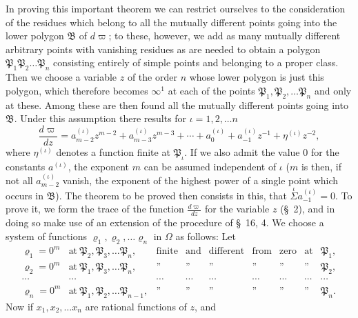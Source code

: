 \documentclass{article}
\begin{document}
In proving this important theorem we can restrict ourselves to the consideration of the residues which belong to all the mutually different points going into the lower polygon $\mathfrak{B}$ of $d\varpi$; to these, however, we add as many mutually different arbitrary points with vanishing residues as are needed to obtain a polygon $\mathfrak{P}_{1}\mathfrak{P}_{2}\ldots\mathfrak{P}_{n}$ consisting entirely of simple points and belonging to a proper class. Then we choose a variable $z$ of the order $n$ whose lower polygon is just this polygon, which therefore becomes $\infty^{1}$ at each of the points $\mathfrak{P}_{1}, \mathfrak{P}_{2}, \ldots \mathfrak{P}_{n}$ and only at these. Among these are then found all the mutually different points going into $\mathfrak{B}$. Under this assumption there results for $\iota = 1, 2, \ldots n$
\[ \frac{d\varpi}{dz} = a_{m-2}^{(\iota)}z^{m-2}+a_{m-3}^{(\iota)}z^{m-3}+\cdots+a_{0}^{(\iota)}+a_{-1}^{(\iota)}z^{-1}+\eta^{(\iota)}z^{-2}, \tag{3.} \]
where $\eta^{(\iota)}$ denotes a function finite at $\mathfrak{P}_{\iota}$. If we also admit the value 0 for the constants $a^{(\iota)}$, the exponent $m$ can be assumed independent of $\iota$ ($m$ is then, if not all $a_{m-2}^{(\iota)}$ vanish, the exponent of the highest power of a single point which occurs in $\mathfrak{B}$). The theorem to be proved then consists in this, that $\overset{\iota}{\Sigma} a_{-1}^{(\iota)} = 0$. To prove it, we form the trace of the function $\frac{d\varpi}{dz}$ for the variable $z$ (§~2), and in doing so make use of an extension of the procedure of §~16, 4. We choose a system of functions $\varrho_{1}, \varrho_{2}, \ldots \varrho_{n}$ in $\Omega$ as follows: Let
\[ \begin{matrix}
\varrho_{1} = 0^{m} & \text{at}\ \mathfrak{P}_{2}, \mathfrak{P}_{3}, \ldots \mathfrak{P}_{n}, & \text{finite} & \text{and} & \text{different} & \text{from} & \text{zero} & \text{at} & \mathfrak{P}_{1}, \\
\varrho_{2} = 0^{m} & \text{at}\ \mathfrak{P}_{1}, \mathfrak{P}_{3}, \ldots \mathfrak{P}_{n}, & \text{''} & \text{''} & \text{''} & \text{''} & \text{''} & \text{''} & \mathfrak{P}_{2}, \\
\cdots & \cdots & \cdots & \cdots & \cdots & \cdots & \cdots & \cdots & \cdots \\
\varrho_{n} = 0^{m} & \text{at}\ \mathfrak{P}_{1}, \mathfrak{P}_{2}, \ldots \mathfrak{P}_{n-1}, & \text{''} & \text{''} & \text{''} & \text{''} & \text{''} & \text{''} & \mathfrak{P}_{n}.
\end{matrix} \]
Now if $x_{1}, x_{2}, \ldots x_{n}$ are rational functions of $z$, and
\end{document}

